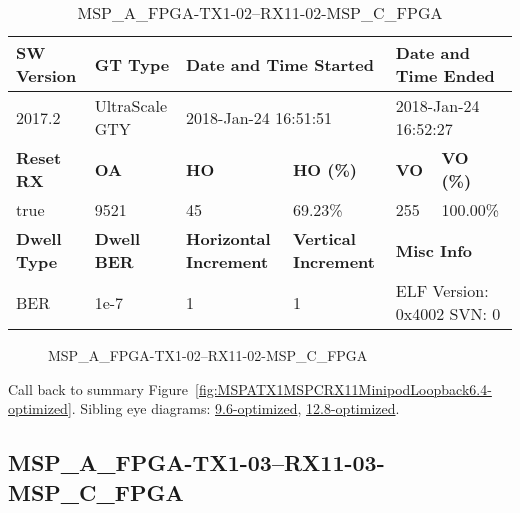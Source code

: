 \begin{table}[h]
\centering
\caption{MSP\_A\_FPGA-TX1-02--RX11-02-MSP\_C\_FPGA}
\label{tab:MSPAFPGATX102RX1102MSPCFPGA6.4-optimized}
\begin{tabular}{@{}|l|l|l|l|l|l|@{}}
\toprule
\textbf{SW Version}                & \textbf{GT Type}   & \multicolumn{2}{l|}{\textbf{Date and Time Started}}            & \multicolumn{2}{l|}{\textbf{Date and Time Ended}}        \\ \midrule
2017.2                       & UltraScale GTY          & \multicolumn{2}{l|}{2018-Jan-24 16:51:51}                   & \multicolumn{2}{l|}{2018-Jan-24 16:52:27}               \\ \midrule
\textbf{Reset RX}                  & \textbf{OA} & \textbf{HO}   & \textbf{HO (\%)} & \textbf{VO} & \textbf{VO (\%)} \\ \midrule
true & 9521        & 45          & 69.23\%        & 255        & 100.00\%       \\ \midrule
\textbf{Dwell Type}                & \textbf{Dwell BER} & \textbf{Horizontal Increment} & \textbf{Vertical Increment}    & \multicolumn{2}{l|}{\textbf{Misc Info}}                  \\ \midrule
BER                            & 1e-7        & 1        & 1           & \multicolumn{2}{l|}{ELF Version: 0x4002 SVN: 0}                         \\ \bottomrule
\end{tabular}
\end{table}

\begin{figure}[h]
\caption{MSP\_A\_FPGA-TX1-02--RX11-02-MSP\_C\_FPGA} \label{fig:MSPAFPGATX102RX1102MSPCFPGA6.4-optimized}
\end{figure}

Call back to summary Figure~\ref{fig:MSPATX1MSPCRX11MinipodLoopback6.4-optimized}.
Sibling eye diagrams: \hyperref[sec:MSPAFPGATX102RX1102MSPCFPGA9.6-optimized]{9.6-optimized}, \hyperref[sec:MSPAFPGATX102RX1102MSPCFPGA12.8-optimized]{12.8-optimized}.

\clearpage
\newpage


\subsection{MSP\_A\_FPGA-TX1-03--RX11-03-MSP\_C\_FPGA}\label{sec:MSPAFPGATX103RX1103MSPCFPGA6.4-optimized}

